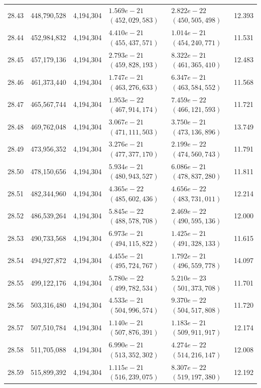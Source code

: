 \documentclass[11pt]{article}
\theoremstyle{definition}
\begin{document}
\begin{longtable}{@{}c r r >{\raggedleft\arraybackslash}p{34mm} >{\raggedleft\arraybackslash}p{34mm} r@{}}
28.43 & 448{,}790{,}528 & 4{,}194{,}304 & $1.569e-21$ $(452{,}029{,}583)$ & $2.822e-22$ $(450{,}505{,}498)$ & 12.393 \\
28.44 & 452{,}984{,}832 & 4{,}194{,}304 & $4.410e-21$ $(455{,}437{,}571)$ & $1.014e-21$ $(454{,}240{,}771)$ & 11.531 \\
28.45 & 457{,}179{,}136 & 4{,}194{,}304 & $2.793e-21$ $(459{,}828{,}193)$ & $8.322e-21$ $(461{,}365{,}410)$ & 12.483 \\
28.46 & 461{,}373{,}440 & 4{,}194{,}304 & $1.747e-21$ $(463{,}276{,}633)$ & $6.347e-21$ $(463{,}584{,}552)$ & 11.568 \\
28.47 & 465{,}567{,}744 & 4{,}194{,}304 & $1.953e-22$ $(467{,}914{,}174)$ & $7.459e-22$ $(466{,}121{,}593)$ & 11.721 \\
28.48 & 469{,}762{,}048 & 4{,}194{,}304 & $3.067e-21$ $(471{,}111{,}503)$ & $3.750e-21$ $(473{,}136{,}896)$ & 13.749 \\
28.49 & 473{,}956{,}352 & 4{,}194{,}304 & $3.276e-21$ $(477{,}377{,}170)$ & $2.199e-22$ $(474{,}560{,}743)$ & 11.791 \\
28.50 & 478{,}150{,}656 & 4{,}194{,}304 & $5.934e-21$ $(480{,}943{,}527)$ & $6.086e-21$ $(478{,}837{,}280)$ & 11.811 \\
28.51 & 482{,}344{,}960 & 4{,}194{,}304 & $4.365e-22$ $(485{,}602{,}436)$ & $4.656e-22$ $(483{,}731{,}011)$ & 12.214 \\
28.52 & 486{,}539{,}264 & 4{,}194{,}304 & $5.845e-22$ $(488{,}578{,}708)$ & $2.469e-22$ $(490{,}595{,}136)$ & 12.000 \\
28.53 & 490{,}733{,}568 & 4{,}194{,}304 & $6.973e-21$ $(494{,}115{,}822)$ & $1.425e-21$ $(491{,}328{,}133)$ & 11.615 \\
28.54 & 494{,}927{,}872 & 4{,}194{,}304 & $4.455e-21$ $(495{,}724{,}767)$ & $1.792e-21$ $(496{,}559{,}778)$ & 14.097 \\
28.55 & 499{,}122{,}176 & 4{,}194{,}304 & $5.780e-22$ $(499{,}782{,}534)$ & $5.210e-23$ $(501{,}373{,}708)$ & 11.701 \\
28.56 & 503{,}316{,}480 & 4{,}194{,}304 & $4.533e-21$ $(504{,}996{,}574)$ & $9.370e-22$ $(504{,}517{,}808)$ & 11.720 \\
28.57 & 507{,}510{,}784 & 4{,}194{,}304 & $1.140e-21$ $(507{,}876{,}391)$ & $1.183e-21$ $(509{,}911{,}917)$ & 12.174 \\
28.58 & 511{,}705{,}088 & 4{,}194{,}304 & $6.990e-21$ $(513{,}352{,}302)$ & $4.274e-22$ $(514{,}216{,}147)$ & 12.008 \\
28.59 & 515{,}899{,}392 & 4{,}194{,}304 & $1.115e-21$ $(516{,}239{,}075)$ & $8.307e-22$ $(519{,}197{,}380)$ & 12.192 \\

\end{longtable}
\end{document}
